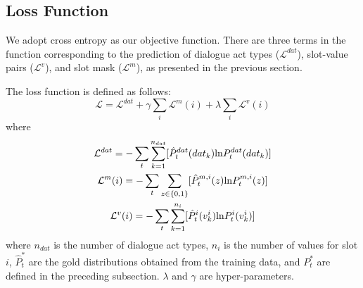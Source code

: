 


\subsection{Loss Function}
We adopt cross entropy as our objective function.
There are three terms in the function corresponding to the prediction of dialogue act types ($\mathcal{L}^{dat}$), slot-value pairs ($\mathcal{L}^{v}$), and slot mask ($\mathcal{L}^{m}$), as presented in the previous section.

The loss function is defined as follows:
\begin{equation}
\label{eq:loss}
    \mathcal{L}=\mathcal{L}^{dat}+\gamma \sum_i\mathcal{L}^m(i)+\lambda\sum_i\mathcal{L}^v(i)
\end{equation}
where
\begin{gather}
    \mathcal{L}^{dat}=-\sum_t\sum_{k=1}^{n_{dat}}[\hat{P}_t^{dat}(dat_k) {\rm ln}{P_t^{dat}(dat_k)}] \\  %
    \mathcal{L}^m(i)=-\sum_t\sum_{z \in \{0,1\}}[\hat{P}_t^{m,i}(z){\rm ln}{P_t^{m,i}(z)}] \\ %
    \mathcal{L}^v(i)=-\sum_t \sum_{k=1}^{n_{i}}[\hat{P}_t^{i}(v_k^i){\rm ln}{P_t^{i}(v_k^i)}] %
\end{gather}
where $n_{dat}$ is the number of dialogue act types,
$n_i$ is the number of values for slot $i$,
$\hat{P}_t^*$ are the gold distributions obtained from the training data, and $P_t^*$ are defined in the preceding subsection.
%
$\lambda$ and $\gamma$ are hyper-parameters.


